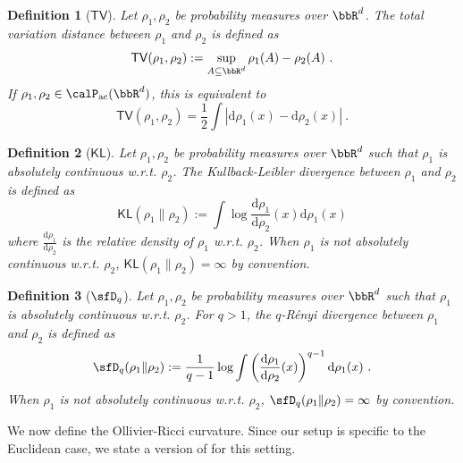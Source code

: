 \documentclass[11pt]{article}
\newtheorem{definition}{Definition}[section]
\newcounter{ct}
\newcommand{\rmd}{\mathrm{d}}
\begin{document}
\begin{definition}[\(\mathsf{TV}\)]
Let \(\rho_{1}, \rho_{2}\) be probability measures over \(\bbR^{d}\).
The total variation distance between \(\rho_{1}\) and \(\rho_{2}\) is defined as
\begin{equation*}
    \mathsf{TV}(\rho_{1}, \rho_{2}) := \sup_{A \subseteq \bbR^{d}} \rho_{1}(A) - \rho_{2}(A)~.
\end{equation*}
If \(\rho_{1}, \rho_{2} \in \calP_{\mathrm{ac}}(\bbR^{d})\), this is equivalent to
\begin{equation*}
    \mathsf{TV}(\rho_{1}, \rho_{2}) = \frac{1}{2}\int |\rmd \rho_{1}(x) - \rmd \rho_{2}(x)|~.
\end{equation*}
\end{definition}

\begin{definition}[\(\mathsf{KL}\)]
Let \(\rho_{1}, \rho_{2}\) be probability measures over \(\bbR^{d}\) such that \(\rho_{1}\) is absolutely continuous w.r.t. \(\rho_{2}\).
The Kullback-Leibler divergence between \(\rho_{1}\) and \(\rho_{2}\) is defined as
\begin{equation*}
    \mathsf{KL}(\rho_{1} \| \rho_{2}) := \int \log \frac{\rmd \rho_{1}}{\rmd \rho_{2}}(x) \rmd\rho_{1}(x)
\end{equation*}
where \(\frac{\rmd \rho_{1}}{\rmd \rho_{2}}\) is the relative density of \(\rho_{1}\) w.r.t. \(\rho_{2}\).
When \(\rho_{1}\) is not absolutely continuous w.r.t. \(\rho_{2}\), \(\mathsf{KL}(\rho_{1} \| \rho_{2}) = \infty\) by convention.
\end{definition}

\begin{definition}[\(\sfD_{q}\)]
Let \(\rho_{1}, \rho_{2}\) be probability measures over \(\bbR^{d}\) such that \(\rho_{1}\) is absolutely continuous w.r.t. \(\rho_{2}\).
For \(q > 1\), the \(q\)-R\'{e}nyi divergence between \(\rho_{1}\) and \(\rho_{2}\) is defined as
\begin{equation*}
    \sfD_{q}(\rho_{1} \| \rho_{2}) := \frac{1}{q - 1}\log \int \left(\frac{\rmd \rho_{1}}{\rmd \rho_{2}}(x)\right)^{q - 1}  \rmd \rho_{1}(x)~.
\end{equation*}
When \(\rho_{1}\) is not absolutely continuous w.r.t. \(\rho_{2}\), \(\sfD_{q}(\rho_{1} \| \rho_{2}) = \infty\) by convention.
\end{definition}

We now define the Ollivier-Ricci curvature.
Since our setup is specific to the Euclidean case, we state a version of \citet[Def. 1]{ollivier2009ricci} for this setting.
\end{document}
